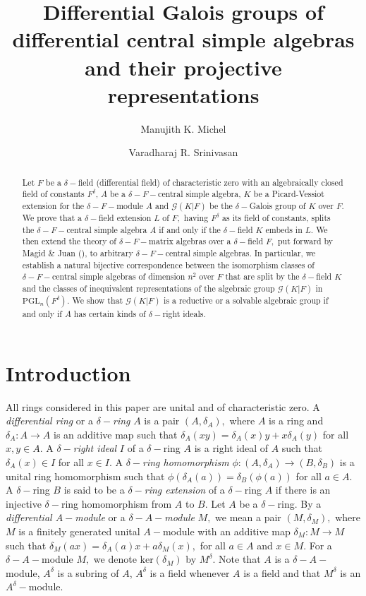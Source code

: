 \documentclass[preprint, 11pt]{amsart}
\theoremstyle{corollary}
\theoremstyle{remark}
\theoremstyle{proposition}
\numberwithin{equation}{subsection}
\begin{document}
	
	\title{Differential Galois groups of differential central simple algebras and their projective representations}
	\author{Manujith K. Michel \and Varadharaj R. Srinivasan}
	
	\maketitle
\begin{abstract}
	Let $F$ be a $\delta-$field (differential field) of characteristic zero with an  algebraically closed field of constants $F^\delta$,  $A$ be a $\delta-F-$central simple algebra, $K$ be a Picard-Vessiot extension for the $\delta-F-$module $A$ and $\mathscr G(K|F)$ be the $\delta-$Galois group of $K$ over $F.$  We prove that a $\delta-$field extension $L$ of $F,$ having $F^\delta$ as its field of constants, splits the $\delta-F-$central simple algebra $A$ if and only if the $\delta-$field $K$ embeds in $L.$ 
	We then extend the theory of  $\delta-F-$matrix algebras over a $\delta-$field $F,$ put forward by Magid \& Juan (\cite{JM08}), to arbitrary $\delta-F-$central simple algebras.  In particular,  we  establish a natural bijective correspondence between the isomorphism classes of $\delta-F-$central simple algebras of dimension $n^2$ over $F$ that are split  by the $\delta-$field $K$ and the classes of  inequivalent representations of the algebraic group $\mathscr G(K|F)$ in $\mathrm{PGL}_n(F^\delta).$ We show that  $\mathscr G(K|F)$ is a reductive or a solvable algebraic group if and only if $A$ has certain kinds of $\delta-$right ideals.   \end{abstract}



\section{Introduction} All rings considered in this paper are unital and of characteristic zero.      A \emph{differential ring} or a \emph{$\delta-$ring} $A$ is a pair $(A, \delta_A),$ where $A$ is  a ring and  $\delta_A: A\to A$ is an additive map such that $\delta_A(xy)=\delta_A(x)y+x\delta_A(y)$ for all $x, y \in A.$ A \emph{$\delta-$right ideal} $I$ of a $\delta-$ring $A$ is a  right ideal of $A$ such that $\delta_A(x)\in I$ for all $x\in I.$ A \emph{$\delta-$ring homomorphism} $\phi: (A,\delta_A)\to (B, \delta_B)$ is a unital ring homomorphism such that $\phi(\delta_A(a))=\delta_B(\phi(a))$ for all $a\in A.$ A $\delta-$ring $B$ is said to be a \emph{$\delta-$ring extension} of a $\delta-$ring $A$ if  there is an injective $\delta-$ring homomorphism from $A$ to $B.$ Let $A$ be a $\delta-$ring. By a \emph{differential $A-$module} or a \emph{$\delta-A-$module} $M,$  we mean a pair $(M, \delta_M),$ where $M$ is a  finitely generated unital $A-$module  with an additive map $\delta_M: M\to M$ such that  $\delta_M(ax)=\delta_A(a)x+a\delta_M(x),$ for all $a\in  A$ and $x\in M.$ For a $\delta-A-$module $M,$ we denote $\mathrm{ker}(\delta_M)$ by $M^{\delta}.$ Note that $A$  is a $\delta-A-$module, $A^\delta$ is a subring of $A$, $A^\delta$ is a field whenever $A$ is a field and that  $M^\delta$ is an $A^\delta-$module.    
\end{document}

